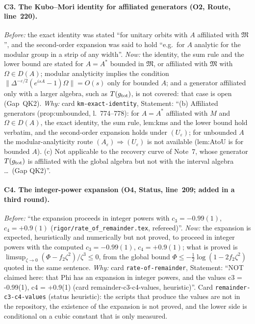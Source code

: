 \documentclass[11pt]{article}
\theoremstyle{accent}
\theoremstyle{definition}
\newcommand{\cM}{\mathfrak{M}}
\newcommand{\eps}{\varepsilon}
\begin{document}
{\paragraph{C3. The Kubo--Mori identity for affiliated generators (O2, Route, line~220).}
\emph{Before:} the exact identity was stated ``for unitary orbits with \(A\) affiliated with
\(\cM\)'', and the second-order expansion was said to hold ``e.g.\ for \(A\) analytic for the
modular group in a strip of any width''.
\emph{Now:} the identity, the sum rule and the lower bound are stated for \(A=A^*\) bounded in
\(\cM\), or affiliated with \(\cM\) with \(\Omega\in D(A)\); modular analyticity implies the
condition \(\|\Delta^{-\eps/2}(e^{isA}-1)\Omega\|=O(s)\) only for bounded \(A\); and a generator
affiliated only with a larger algebra, such as \(T(g_{\rm tot})\), is not covered: that case is open
(Gap~QK2).
\emph{Why:} card \texttt{km-exact-identity}, Statement: ``(b) Affiliated generators (prop:unbounded,
l.~774--778): for \(A=A^*\) affiliated with \(M\) and \(\Omega\in D(A)\), the exact identity, the sum
rule, lem:kms and the lower bound hold verbatim, and the second-order expansion holds under
\((U_\eps)\); for unbounded \(A\) the modular-analyticity route \((A_\eps)\Rightarrow(U_\eps)\) is not
available (lem:AtoU is for bounded \(A\)).  (c) Not applicable to the recovery curve of Note~7, whose
generator \(T(g_{\rm tot})\) is affiliated with the global algebra but not with the interval
algebra \dots\ (Gap QK2)''.
\paragraph{C4. The integer-power expansion (O4, Status, line~209; added in a third round).}
\emph{Before:} ``the expansion proceeds in integer powers with \(c_3=-0.99(1)\), \(c_4=+0.9(1)\)
(\texttt{rigor/rate\_of\_remainder.tex}, refereed)''.
\emph{Now:} the expansion is expected, heuristically and numerically but not proved, to proceed in
integer powers with the computed \(c_3=-0.99(1)\), \(c_4=+0.9(1)\); what is proved is
\(\limsup_{\zeta\to0}(\Phi-f_2\zeta^2)/\zeta^3\le0\), from the global bound
\(\Phi\le-\frac12\log(1-2f_2\zeta^2)\) quoted in the same sentence.
\emph{Why:} card \texttt{rate-of-remainder}, Statement: ``NOT claimed here: that Phi has an
expansion in integer powers, and the values c3 = -0.99(1), c4 = +0.9(1) (card
remainder-c3-c4-values, heuristic)''.  Card \texttt{remainder-c3-c4-values} (status heuristic): the
scripts that produce the values are not in the repository, the existence of the expansion is not
proved, and the lower side is conditional on a cubic constant that is only measured.
}
\end{document}
